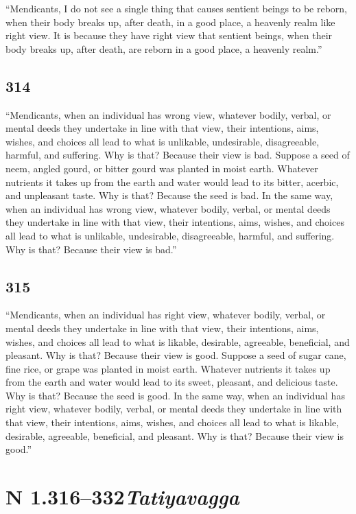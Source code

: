 \documentclass[12pt,openany]{book}%
\newcommand*{\suttatitleacronym}[1]{\smaller[2]{#1}\vspace*{.3em}}
\newcommand*{\suttatitleroot}[1]{\linebreak\smaller[2]\itshape{#1}}
\newcommand*{\tocacronym}[1]{\hspace*{-3.3em}{#1}\quad}
\newcommand*{\tocroot}[1]{(\textit{#1})}
\begin{document}
“Mendicants, I do not see a single thing that causes sentient beings to be reborn, when their body breaks up, after death, in a good place, a heavenly realm like right view. It is because they have right view that sentient beings, when their body breaks up, after death, are reborn in a good place, a heavenly realm.” 

\subsection*{314 }

“Mendicants, when an individual has wrong view, whatever bodily, verbal, or mental deeds they undertake in line with that view, their intentions, aims, wishes, and choices all lead to what is unlikable, undesirable, disagreeable, harmful, and suffering. Why is that? Because their view is bad. Suppose a seed of neem, angled gourd, or bitter gourd was planted in moist earth. Whatever nutrients it takes up from the earth and water would lead to its bitter, acerbic, and unpleasant taste. Why is that? Because the seed is bad. In the same way, when an individual has wrong view, whatever bodily, verbal, or mental deeds they undertake in line with that view, their intentions, aims, wishes, and choices all lead to what is unlikable, undesirable, disagreeable, harmful, and suffering. Why is that? Because their view is bad.” 

\subsection*{315 }

“Mendicants, when an individual has right view, whatever bodily, verbal, or mental deeds they undertake in line with that view, their intentions, aims, wishes, and choices all lead to what is likable, desirable, agreeable, beneficial, and pleasant. Why is that? Because their view is good. Suppose a seed of sugar cane, fine rice, or grape was planted in moist earth. Whatever nutrients it takes up from the earth and water would lead to its sweet, pleasant, and delicious taste. Why is that? Because the seed is good. In the same way, when an individual has right view, whatever bodily, verbal, or mental deeds they undertake in line with that view, their intentions, aims, wishes, and choices all lead to what is likable, desirable, agreeable, beneficial, and pleasant. Why is that? Because their view is good.” 

%
\section*{{\suttatitleacronym AN 1.316–332}{\suttatitleroot Tatiyavagga}}
\addcontentsline{toc}{section}{\tocacronym{AN 1.316–332} \tocroot{Tatiyavagga}}
\end{document}
